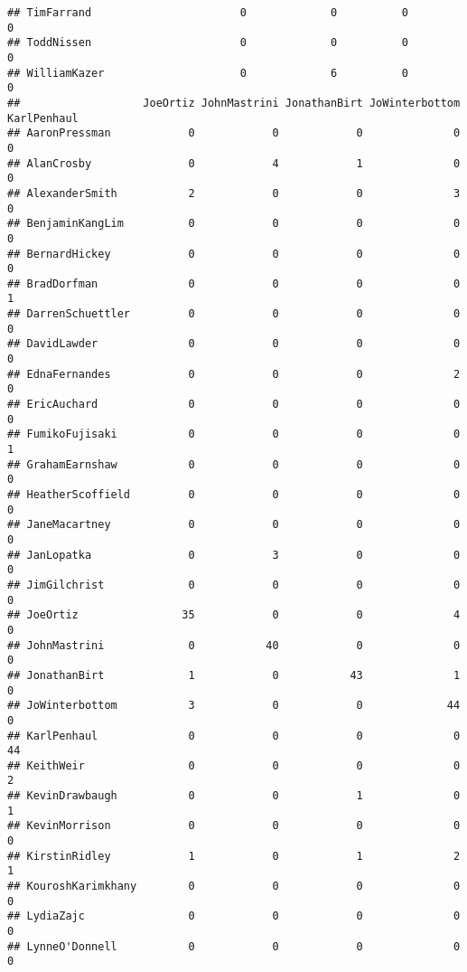 \documentclass[
  12pt,
]{article}
\begin{document}
\begin{verbatim}
## TimFarrand                       0             0          0            0
## ToddNissen                       0             0          0            0
## WilliamKazer                     0             6          0            0
##                   JoeOrtiz JohnMastrini JonathanBirt JoWinterbottom KarlPenhaul
## AaronPressman            0            0            0              0           0
## AlanCrosby               0            4            1              0           0
## AlexanderSmith           2            0            0              3           0
## BenjaminKangLim          0            0            0              0           0
## BernardHickey            0            0            0              0           0
## BradDorfman              0            0            0              0           1
## DarrenSchuettler         0            0            0              0           0
## DavidLawder              0            0            0              0           0
## EdnaFernandes            0            0            0              2           0
## EricAuchard              0            0            0              0           0
## FumikoFujisaki           0            0            0              0           1
## GrahamEarnshaw           0            0            0              0           0
## HeatherScoffield         0            0            0              0           0
## JaneMacartney            0            0            0              0           0
## JanLopatka               0            3            0              0           0
## JimGilchrist             0            0            0              0           0
## JoeOrtiz                35            0            0              4           0
## JohnMastrini             0           40            0              0           0
## JonathanBirt             1            0           43              1           0
## JoWinterbottom           3            0            0             44           0
## KarlPenhaul              0            0            0              0          44
## KeithWeir                0            0            0              0           2
## KevinDrawbaugh           0            0            1              0           1
## KevinMorrison            0            0            0              0           0
## KirstinRidley            1            0            1              2           1
## KouroshKarimkhany        0            0            0              0           0
## LydiaZajc                0            0            0              0           0
## LynneO'Donnell           0            0            0              0           0

\end{verbatim}
\end{document}
